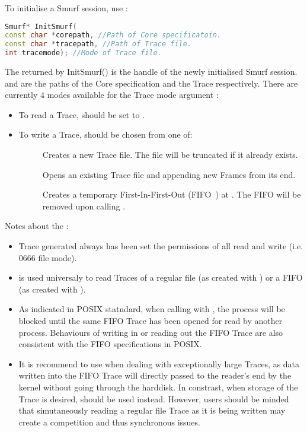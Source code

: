 To initialise a Smurf session, use :
\begin{lstlisting}[language=C++, caption={InitSmurf()\label{api:InitSmurfC}}]
Smurf* InitSmurf(
const char *corepath, //Path of Core specificatoin.
const char *tracepath, //Path of Trace file.
int tracemode);	//Mode of Trace file.
\end{lstlisting}

The  returned by InitSmurf() is the handle of the newly initialised Smurf session.  and  are the paths of the Core specification and the Trace respectively. There are currently $4$ modes available for the Trace mode argument :
\begin{itemize}
	\item To read a Trace,  should be set to .
	\item To write a Trace,  should be chosen from one of:
	\begin{description}
		\item[] Creates a new Trace file. The file will be truncated if it already exists.
		\item[] Opens an existing Trace file and appending new Frames from its end.
		\item[] Creates a temporary First-In-First-Out (FIFO~\cite{FIFO}) at . The FIFO will be removed upon calling .
	\end{description}
\end{itemize}

Notes about the :
\begin{itemize}
	\item Trace generated always has been set the permissions of all read and write (i.e. 0666 file mode).
	\item {} is used universaly to read Traces of a regular file (as created with ) or a FIFO (as created with ).
	\item As indicated in POSIX statndard, when calling with , the process will be blocked until the same FIFO Trace has been opened for read by another process. Behaviours of writing in or reading out the FIFO Trace are also consistent with the FIFO specifications in POSIX.
	\item It is recommend to use  when dealing with exceptionally large Traces, as data written into the FIFO Trace will directly passed to the reader's end by the kernel without going through the harddisk. In constrast, when storage of the Trace is desired,  should be used instead. However, users should be minded that simutaneously reading a regular file Trace as it is being written may create a competition and thus synchronous issues.
\end{itemize}

